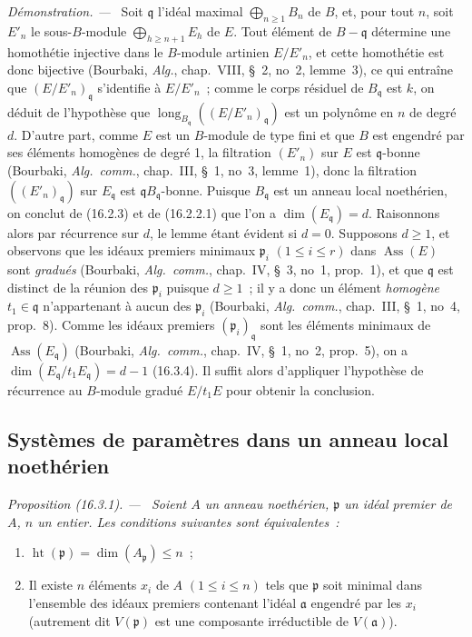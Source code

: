 \documentclass[10pt,oneside]{book}
\makeatletter
\newcommand{\setmanualcurrentlabel}[1]{\def\@currentlabel{#1}}
\newenvironment{proposition}[1][]{%
  \setmanualcurrentlabel{#1}\par\medskip\noindent\itshape Proposition (#1). ---\ }{\par}
\newenvironment{proof}{%
  \par\medskip\noindent\textit{Démonstration. ---\ }}{\par}
\makeatother
\begin{document}
\begin{proof}
Soit $\mathfrak{q}$ l'idéal maximal $\bigoplus_{n\geq1}B_n$ de $B$, et, pour
tout $n$, soit $E'_n$ le sous-$B$-module $\bigoplus_{h\geq n+1}E_h$ de $E$.
Tout élément de $B-\mathfrak{q}$ détermine une homothétie injective dans le
$B$-module artinien $E/E'_n$, et cette homothétie est donc bijective
(Bourbaki, \emph{Alg.}, chap.~VIII, \S~2, no~2, lemme~3), ce qui entraîne que
$(E/E'_n)_{\mathfrak{q}}$ s'identifie à $E/E'_n$~; comme le corps résiduel de
$B_{\mathfrak{q}}$ est $k$, on déduit de l'hypothèse que
$\operatorname{long}_{B_{\mathfrak{q}}}((E/E'_n)_{\mathfrak{q}})$ est un
polynôme en $n$ de degré $d$. D'autre part, comme $E$ est un $B$-module de
type fini et que $B$ est engendré par ses éléments homogènes de degré 1, la
filtration $(E'_n)$ sur $E$ est $\mathfrak{q}$-bonne (Bourbaki,
\emph{Alg.~comm.}, chap.~III, \S~1, no~3, lemme~1), donc la filtration
$((E'_n)_{\mathfrak{q}})$ sur $E_{\mathfrak{q}}$ est
$\mathfrak{q}B_{\mathfrak{q}}$-bonne. Puisque $B_{\mathfrak{q}}$ est un anneau
local noethérien, on conclut de (16.2.3) et de (16.2.2.1) que l'on a
$\dim(E_{\mathfrak{q}})=d$. Raisonnons alors par récurrence sur $d$, le lemme
étant évident si $d=0$. Supposons $d\geq1$, et observons que les idéaux premiers
minimaux $\mathfrak{p}_i$ $(1\leq i\leq r)$ dans
$\operatorname{Ass}(E)$ sont \emph{gradués} (Bourbaki, \emph{Alg.~comm.},
chap.~IV, \S~3, no~1, prop.~1), et que $\mathfrak{q}$ est distinct de la
réunion des $\mathfrak{p}_i$ puisque $d\geq1$~; il y a donc un élément
\emph{homogène} $t_1\in\mathfrak{q}$ n'appartenant à aucun des
$\mathfrak{p}_i$ (Bourbaki, \emph{Alg.~comm.}, chap.~III, \S~1, no~4,
prop.~8). Comme les idéaux premiers $(\mathfrak{p}_i)_{\mathfrak{q}}$ sont les
éléments minimaux de $\operatorname{Ass}(E_{\mathfrak{q}})$ (Bourbaki,
\emph{Alg.~comm.}, chap.~IV, \S~1, no~2, prop.~5), on a
$\dim(E_{\mathfrak{q}}/t_1E_{\mathfrak{q}})=d-1$ (16.3.4). Il suffit alors
d'appliquer l'hypothèse de récurrence au $B$-module gradué $E/t_1E$ pour
obtenir la conclusion.
\end{proof}

\subsection{Systèmes de paramètres dans un anneau local noethérien}
\label{subsection:0.16.3-fr}

\begin{proposition}[16.3.1]
\label{0.16.3.1-fr}
Soient $A$ un anneau noethérien, $\mathfrak{p}$ un idéal premier de $A$, $n$ un
entier. Les conditions suivantes sont équivalentes~:
\begin{enumerate}
  \item[$a)$] $\operatorname{ht}(\mathfrak{p})=
  \dim(A_{\mathfrak{p}})\leq n$~;
  \item[$b)$] Il existe $n$ éléments $x_i$ de $A$ $(1\leq i\leq n)$ tels que
  $\mathfrak{p}$ soit minimal dans l'ensemble des idéaux premiers contenant
  l'idéal $\mathfrak{a}$ engendré par les $x_i$ (autrement dit
  $V(\mathfrak{p})$ est une composante irréductible de $V(\mathfrak{a})$).
\end{enumerate}
\end{proposition}
\end{document}

